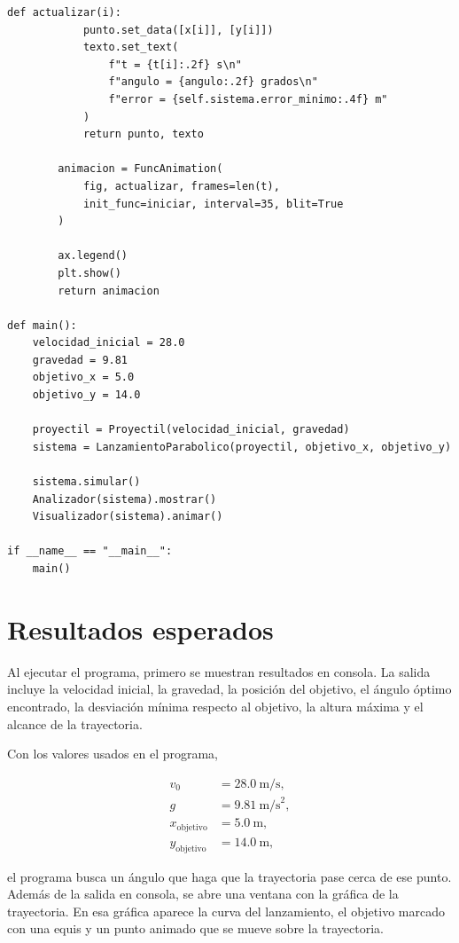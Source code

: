 \documentclass[12pt,letterpaper]{article}
\begin{document}
\begin{lstlisting}[style=pythonstyle]
        def actualizar(i):
            punto.set_data([x[i]], [y[i]])
            texto.set_text(
                f"t = {t[i]:.2f} s\n"
                f"angulo = {angulo:.2f} grados\n"
                f"error = {self.sistema.error_minimo:.4f} m"
            )
            return punto, texto

        animacion = FuncAnimation(
            fig, actualizar, frames=len(t),
            init_func=iniciar, interval=35, blit=True
        )

        ax.legend()
        plt.show()
        return animacion

def main():
    velocidad_inicial = 28.0
    gravedad = 9.81
    objetivo_x = 5.0
    objetivo_y = 14.0

    proyectil = Proyectil(velocidad_inicial, gravedad)
    sistema = LanzamientoParabolico(proyectil, objetivo_x, objetivo_y)

    sistema.simular()
    Analizador(sistema).mostrar()
    Visualizador(sistema).animar()

if __name__ == "__main__":
    main()
\end{lstlisting}

\section{Resultados esperados}

Al ejecutar el programa, primero se muestran resultados en consola. La salida incluye la velocidad inicial, la gravedad, la posici\'{o}n del objetivo, el \'{a}ngulo \'{o}ptimo encontrado, la desviaci\'{o}n m\'{i}nima respecto al objetivo, la altura m\'{a}xima y el alcance de la trayectoria.

Con los valores usados en el programa,

\begin{align*}
v_0 &= 28.0\ \text{m/s},\\
g &= 9.81\ \text{m/s}^2,\\
x_{\text{objetivo}} &= 5.0\ \text{m},\\
y_{\text{objetivo}} &= 14.0\ \text{m},
\end{align*}

el programa busca un \'{a}ngulo que haga que la trayectoria pase cerca de ese punto. Adem\'{a}s de la salida en consola, se abre una ventana con la gr\'{a}fica de la trayectoria. En esa gr\'{a}fica aparece la curva del lanzamiento, el objetivo marcado con una equis y un punto animado que se mueve sobre la trayectoria.
\end{document}
